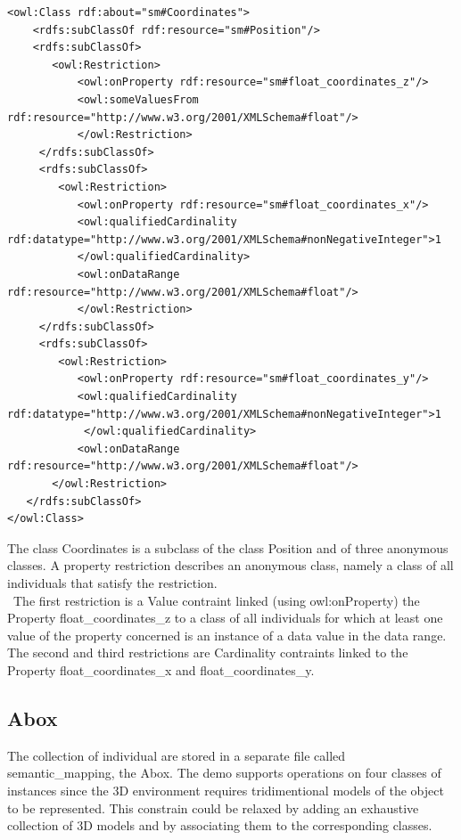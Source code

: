 \begin{lstlisting}
<owl:Class rdf:about="sm#Coordinates">
    <rdfs:subClassOf rdf:resource="sm#Position"/>
    <rdfs:subClassOf>
       <owl:Restriction>
           <owl:onProperty rdf:resource="sm#float_coordinates_z"/>
           <owl:someValuesFrom rdf:resource="http://www.w3.org/2001/XMLSchema#float"/>
           </owl:Restriction>
     </rdfs:subClassOf>
     <rdfs:subClassOf>
        <owl:Restriction>
           <owl:onProperty rdf:resource="sm#float_coordinates_x"/>
           <owl:qualifiedCardinality rdf:datatype="http://www.w3.org/2001/XMLSchema#nonNegativeInteger">1
           </owl:qualifiedCardinality>
           <owl:onDataRange rdf:resource="http://www.w3.org/2001/XMLSchema#float"/>
           </owl:Restriction>
     </rdfs:subClassOf>
     <rdfs:subClassOf>
        <owl:Restriction>
           <owl:onProperty rdf:resource="sm#float_coordinates_y"/>
           <owl:qualifiedCardinality rdf:datatype="http://www.w3.org/2001/XMLSchema#nonNegativeInteger">1
			</owl:qualifiedCardinality>
           <owl:onDataRange rdf:resource="http://www.w3.org/2001/XMLSchema#float"/>
       </owl:Restriction>
   </rdfs:subClassOf>
</owl:Class>   
\end{lstlisting}

The class Coordinates is a subclass of the class Position and of three anonymous classes. A property restriction describes an anonymous class, namely a class of all individuals that satisfy the restriction. \\\
The first restriction is a Value contraint linked (using owl:onProperty) the Property float\_coordinates\_z  to a class of all individuals for which at least one value of the property concerned is an instance of a data value in the data range.\\
The second and third restrictions are Cardinality contraints linked to the Property float\_coordinates\_x and float\_coordinates\_y.


\subsection{Abox}
\label{subsec:abox}
The collection of individual are stored in a separate file called semantic\_mapping, the Abox. The demo supports operations on four classes of instances since the 3D environment requires tridimentional models of the object to be represented. This constrain could be relaxed by adding an exhaustive collection of 3D models and by associating them to the corresponding classes.\\

